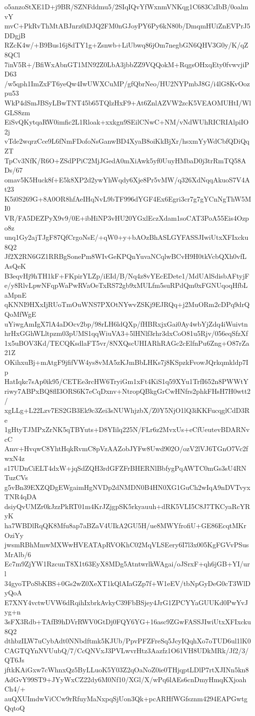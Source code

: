 o5anzoStXE1D+j9BR/SZNFddmu5/2SIqIQvYfWxnmVNKqg1C683CzIbB/0oalmvY
mvC+PkRvThMtABJnrz0iDJQ2FM0nGJoyPY6Py6kN80b/DmqmHUiZnEVPrJ5DDgjB
RZcK4w/+B9Bus16j8dTY1g+Zsnwb+LiUbwq86jOm7negbGN6QHV3G0y/K/qZ8QCl
7inV5R+/BfiWxAbnGT1MN92Z0LbA3jbbZZ9VQQokM+RqgsOHxqEty0fvwvjiPD63
/w5qph1ImZxFT6yeQw4IwUWXCuMP/gfQbrNeo/HU2NYPmbJ8G/i4lG8KvOozpu53
WkP4dSmJBSyLBwTNT45b65TQlzHxF9+At6ZnlAZVW2zcK5VEAOMUHtI/WlGLS8zm
EiSvQKytqaRW0imfic2L1Rloak+xxkgn9SEilCNwC+NM/vNdWUhRICRIAlpiIO2j
vTde2wqrzCce9L6fNmFDofoNsGanwBD4XyaB8oiKkBjXr/hsxmYyWdCbfQDiQqZT
TpCv3NfK/R6O+ZSdPPiC2MjJGedA0mXiAwk5yf0UuyHMbaD0j3trRmTQ58ADs/67
omav5K5Huck8f+E5k8XP2d2ywYhWqdy6Xje8Pr5vMW/q326XdNqqAkuoS7V4At23
K5i0S269G+8A0OR8hfAeIHqNvL9bTF996dYGF4Ex6Egri3cr7g7gYCnNgThW5MI0
VR/FA5DEZPyX9v9/0E+ibHiNP3vHU20YGxlEczXdam1soCAT3PoA55Eis4Ozpo8z
unq1Gy2ajTJgF87QfCrgoNsE/+qW0+y+bAOzBhASLGYFASSJIwiUtxXFIxcku8Q2
Jf2X2RN6GZ1RRBgSonePm8WIvGeKPQnYuvaNCqlwBCvH9H0tkVcbQXh0vfLAsQeK
B3eqvHj9hTH1kF+FKpirYLZp/iEId/B/Nq4z8vYEcEDete1/MdUAlSdisbAFtyjF
e/y8RlvLpwNFqpWaPwRVaOeTxRS72gb9xMULfm5suRPdQm0xFGNUqoqHfbLaMpnE
qKNNI9HXxIjRUoTmOuWNS7PXOtNYwvZSKj9EJRQq+j2MuORm2cDPq9drQQoMfWgE
uYiwgAmIgX7lA4aDOcv2bp/98rLH6ldQXp/fHBRxjxGai0Ay4wbYjZdq4iWuivtn
hrHxGGhWLltpzm03pUMS1qqWiuVA3+5lHNlf3rhr3dxCoO81u5Rjv/056eqSfzXf
1x5uBOV3Kd/TECQKsdlaFT5vr/8NXQscUHIARhRAGc2cElfnPu6Zng+O87rZa21Z
OKihxuBj+mAtgF9jfifVW4ys8vMA5zKJmBbLHKs7j8KSpzkFvowJQrkqmkldp7Ip
HatIqkc7sAp0ik95/CETEe3rcHW6TryiGm1xFt4KiS1q59XYu1TrfI652n8PWWtY
riwy7ABPxBQ8flI3ORS6K7eCqDxnv+NtropQBkgGrCwHNfrs2phkFHsH7H0wtt2/
xgLLg+L22Lzv7ES2GB3Ek9c3Zei3sNUWhjzbX/Z0Y5NjO1lQ3iKKFucqglCdD3Re
1gHtyTJMPxZrNK5qTBYuts+D8YIilq225N/FLr6z2MvxUs+eCfUeutevBDARNvcC
Amv+HvqwC8YhtHqkRvmC8pVzAAZobJYFw8Uwd902O/ozV2lVJ6TGnO7Vc2fwxN4z
s17UDnCiELT4dxW+jqSdZQH3rdGFZFrBHERNlBbfygPqAWTC0mGs3sU4RNTuzCVs
g5vBn39EXZQDgEWgaimHgNVDp2dNMDN0B4HN0XG1GuCh2wIqA9nDVTvyxTNR4qDA
dsiyQvUMZr0kJzzPkRT01m4KrJZjgpSK5rkyauuh+dRK5VLI5C8J7TKCyaRcYRyK
ha7WBDlRqQK8Mfu8ap7aBZaV4UIkA2GU5H/ue8MWYfrofiU+GE86EcqtMKrOziYy
jwsmRBhMmwMXWwHVEATApRVOKhC02MqVLSEery6I7l3x005KgFGVvPSusMrAlb/6
Ec7m9ZjYW1RzcunT8X1t63EyX8MDg5AtntwrlkWAgai/oJSrxF+qh6jGB+YI/url
34gyoTPoSbKBS+0Gs2wZ0XeXT1kQlAIaGZp7f+W1eEV/tbNpGyDeG0cT3WlDyQoA
E7XNY4vctwUVW6dRqihIxbrkAvkyC39FbBSjey4JrG1ZPCYYaGUUKd0PwYvJyg+n
3sFX3Rdb+TAfB9hDVrRWV0GtDj0FQY6YG+16asc9ZGwFASSJIwiUtxXFIxcku8Q2
dthbzILW7uCybAdt0NNbdftmk5KJUb/PpvPFZFreSq5JcyIQqhXo7oTUD6ul1lK0
CAGTQYnNVUubQ/7/CcQNVxJ3PVLwvrHtz3Aazfz1O61VH8UDkMRk/Jf2/3/QT6Js
jftkKAiGxw7cWhnxQz5ByLLuoK5Y03Z2qOaNoZ0ie0THjqptLDlP7rtXJINn5kn8
AdGvY99ST9+JYyWxCZ22dy6M0Nf10/XGl/X/wPq6lAEs6cnDmyHmqKXjoahCh4/+
auQXUImdwViCCw9rRfuyMaNxpqSjUon3Qk+pcARHfWGfsznm4294EAPGwtgQqtoQ
